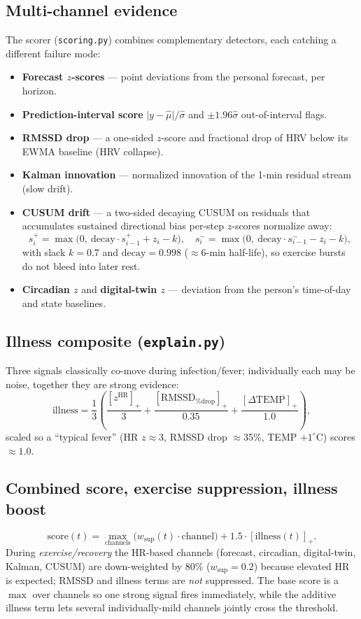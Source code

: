 \documentclass[11pt,a4paper]{article}
\newcommand{\code}[1]{\lstinline[basicstyle=\ttfamily\normalsize]!#1!}
\begin{document}
\subsection{Multi-channel evidence}
The scorer (\code{scoring.py}) combines complementary detectors, each catching a
different failure mode:
\begin{itemize}[leftmargin=1.4em,itemsep=2pt]
\item \textbf{Forecast $z$-scores} --- point deviations from the personal
      forecast, per horizon.
\item \textbf{Prediction-interval score} $\lvert y-\hat\mu\rvert/\hat\sigma$ and
      $\pm1.96\hat\sigma$ out-of-interval flags.
\item \textbf{RMSSD drop} --- a one-sided $z$-score and fractional drop of HRV
      below its EWMA baseline (HRV collapse).
\item \textbf{Kalman innovation} --- normalized innovation of the 1-min residual
      stream (slow drift).
\item \textbf{CUSUM drift} --- a two-sided decaying CUSUM on residuals that
      accumulates sustained directional bias per-step $z$-scores normalize away:
      \[
      s^+_i=\max\!\big(0,\ \text{decay}\cdot s^+_{i-1}+z_i-k\big),\quad
      s^-_i=\max\!\big(0,\ \text{decay}\cdot s^-_{i-1}-z_i-k\big),
      \]
      with slack $k=0.7$ and $\text{decay}=0.998$ ($\approx$6-min half-life), so
      exercise bursts do not bleed into later rest.
\item \textbf{Circadian $z$} and \textbf{digital-twin $z$} --- deviation from the
      person's time-of-day and state baselines.
\end{itemize}

\subsection{Illness composite (\texttt{explain.py})}
Three signals classically co-move during infection/fever; individually each may
be noise, together they are strong evidence:
\[
\text{illness}=\frac13\!\left(
\frac{[z^{\text{HR}}]_+}{3}
+\frac{[\text{RMSSD}_{\%\text{drop}}]_+}{0.35}
+\frac{[\Delta\text{TEMP}]_+}{1.0}\right),
\]
scaled so a ``typical fever'' (HR $z\!\approx\!3$, RMSSD drop $\approx$35\%, TEMP
$+1^\circ$C) scores $\approx 1.0$.

\subsection{Combined score, exercise suppression, illness boost}
\[
\text{score}(t)=\max_{\text{channels}}\Big(w_{\text{sup}}(t)\cdot\text{channel}\Big)
+1.5\cdot[\text{illness}(t)]_+ .
\]
During \emph{exercise/recovery} the HR-based channels (forecast, circadian,
digital-twin, Kalman, CUSUM) are down-weighted by $80\%$
($w_{\text{sup}}=0.2$) because elevated HR is expected; RMSSD and illness terms
are \emph{not} suppressed. The base score is a $\max$ over channels so one strong
signal fires immediately, while the additive illness term lets several
individually-mild channels jointly cross the threshold.
\end{document}

